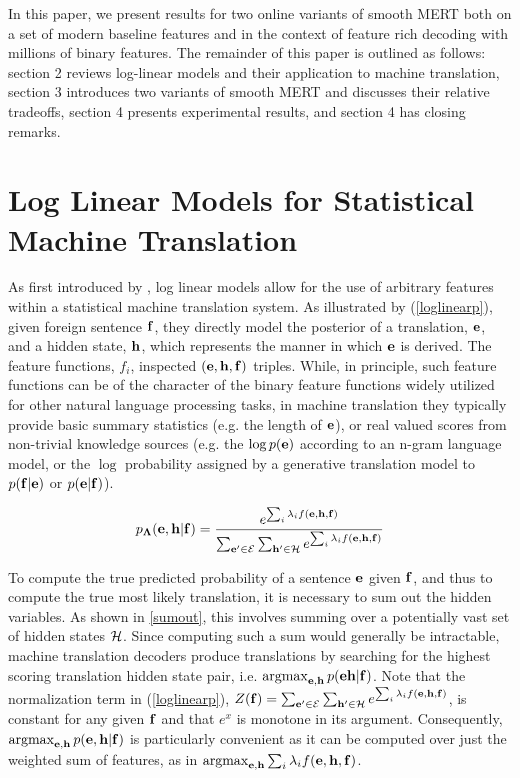 \documentclass[11pt]{article}
\DeclareMathOperator*{\argmax}{argmax}
\begin{document}
In this paper, we present results for two online variants of smooth MERT both on a set of modern baseline features and in the context of feature rich decoding with millions of binary features. The remainder of this paper is outlined as follows: section 2 reviews log-linear models and their application to machine translation, section 3 introduces two variants of smooth MERT and discusses their relative tradeoffs, section 4 presents experimental results, and section 4 has closing remarks. 



\section{Log Linear Models for Statistical Machine Translation}

As first introduced by , log linear models allow for the use of arbitrary features within a statistical machine translation system. As illustrated by (\ref{loglinearp}), given foreign sentence ${\bf f}$, they directly model the posterior of a translation, ${\bf e}$, and a hidden state, ${\bf h}$, which represents the manner in which ${\bf e}$ is derived. The feature functions, $f_i$, inspected $({\bf e}, {\bf h} ,{\bf f})$ triples. While, in principle, such feature functions can be of the character of the binary feature functions widely utilized for other natural language processing tasks, in machine translation they typically provide basic summary statistics (e.g. the length of ${\bf e}$),   or real valued scores from non-trivial knowledge sources (e.g. the $\log p({\bf e})$ according to an n-gram language model, or the $\log$ probability assigned by a generative translation model to $p({\bf f}|{\bf e})$ or $p({\bf e}|{\bf f})$). 


\begin{equation}
p_{{\bf \Lambda}} ({\bf e}, {\bf h} |{\bf f}) = \frac {e^{\sum_i \lambda_i f({\bf e}, {\bf h} ,{\bf f})}} { \sum_{{\bf e^\prime} \in {\cal E}} \sum_{{\bf h^\prime} \in {\cal H}} e^{\sum_i \lambda_i f({\bf e},{\bf h},{\bf f})} }
\label{loglinearp}
\end{equation}

To compute the true predicted probability of a sentence ${\bf e}$ given ${\bf f}$, and thus to compute the true most likely translation, it is necessary to sum out the hidden variables. As shown in \ref{sumout}, this involves summing over a potentially vast set of hidden states ${\cal H}$. Since computing such a sum would generally be intractable, machine translation decoders produce translations by searching for the highest scoring translation hidden state pair, i.e. $\argmax_{{\bf e}, {\bf h}} p({\bf e} {\bf h} | {\bf f})$. Note that the normalization term in (\ref{loglinearp}), $Z({\bf f}) = \sum_{{\bf e^\prime} \in {\cal E}} \sum_{{\bf h^\prime} \in {\cal H}} e^{\sum_i \lambda_i f({\bf e},{\bf h},{\bf f})}$, is constant for any given ${\bf f}$ and that $e^x$ is monotone in its argument. Consequently, $\argmax_{{\bf e}, {\bf h}} p({\bf e}, {\bf h} | {\bf f})$ is particularly convenient as it can be computed over just the weighted sum of features, as in $\argmax_{{\bf e}, {\bf h}}\sum_i \lambda_i f({\bf e}, {\bf h} ,{\bf f})$.
\end{document}
